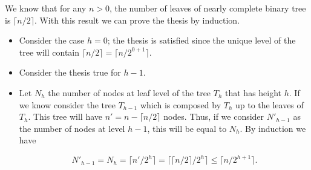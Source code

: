 \documentclass{article}
\begin{document}
	\noindent We know that for any $n > 0$, the number of leaves of nearly complete binary tree is $ \lceil n/2 \rceil$. With this result we can prove the thesis by induction. 
	\begin{itemize}
		\item Consider the case $h=0$; the thesis is satisfied since the unique level of the tree will contain $ \lceil n/2 \rceil = \lceil n/2^{0+1} \rceil$.
		\item Consider the thesis true for $h-1$.
		\item Let $N_h$ the number of nodes at leaf level of the tree $T_h$ that has height $h$. If we know consider the tree $T_{h-1}$ which is composed by $T_h$ up to the leaves of $T_h$. This tree will have $n' = n- \lceil n/2 \rceil$ nodes. Thus, if we consider $N'_{h-1}$ as the number of nodes at level $h-1$, this will be equal to $N_h$. By induction we have 
		
		$$
		N'_{h-1} = N_{h} = \lceil n' / 2^h\rceil = \lceil \lceil n/2\rceil / 2^h\rceil \leq \lceil n / 2^{h+1}\rceil.
		$$ 
	\end{itemize}

	
	
	
\end{document}
